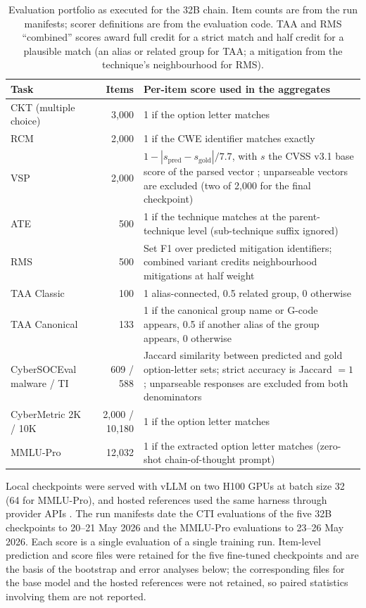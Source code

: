 \documentclass[preprint,12pt,authoryear]{elsarticle}
\begin{document}
\begin{table}[!htbp]
\centering\footnotesize
\caption{Evaluation portfolio as executed for the 32B chain. Item counts are from the run manifests; scorer definitions are from the evaluation code. TAA and RMS ``combined'' scores award full credit for a strict match and half credit for a plausible match (an alias or related group for TAA; a mitigation from the technique's neighbourhood for RMS).}\label{tab:portfolio}
\begin{tabularx}{\textwidth}{@{}lrX@{}}
\toprule Task & Items & Per-item score used in the aggregates \\\midrule
CKT (multiple choice) & 3,000 & 1 if the option letter matches \\
RCM & 2,000 & 1 if the CWE identifier matches exactly \\
VSP & 2,000 & $1-|s_{\text{pred}}-s_{\text{gold}}|/7.7$, with $s$ the CVSS v3.1 base score of the parsed vector \citep{first2019cvss}; unparseable vectors are excluded (two of 2,000 for the final checkpoint) \\
ATE & 500 & 1 if the technique matches at the parent-technique level (sub-technique suffix ignored) \\
RMS & 500 & Set F1 over predicted mitigation identifiers; combined variant credits neighbourhood mitigations at half weight \\
TAA Classic & 100 & 1 alias-connected, 0.5 related group, 0 otherwise \\
TAA Canonical & 133 & 1 if the canonical group name or G-code appears, 0.5 if another alias of the group appears, 0 otherwise \\
CyberSOCEval malware / TI & 609 / 588 & Jaccard similarity between predicted and gold option-letter sets; strict accuracy is Jaccard $=1$; unparseable responses are excluded from both denominators \\
CyberMetric 2K / 10K & 2,000 / 10,180 & 1 if the option letter matches \\
MMLU-Pro & 12,032 & 1 if the extracted option letter matches (zero-shot chain-of-thought prompt) \\\bottomrule
\end{tabularx}
\end{table}

Local checkpoints were served with vLLM \citep{kwon2023vllm} on two H100 GPUs at batch size 32 (64 for MMLU-Pro), and hosted references used the same harness through provider APIs \citep{glaukopis2026software}. The run manifests date the CTI evaluations of the five 32B checkpoints to 20--21 May 2026 and the MMLU-Pro evaluations to 23--26 May 2026. Each score is a single evaluation of a single training run. Item-level prediction and score files were retained for the five fine-tuned checkpoints and are the basis of the bootstrap and error analyses below; the corresponding files for the base model and the hosted references were not retained, so paired statistics involving them are not reported.
\end{document}
